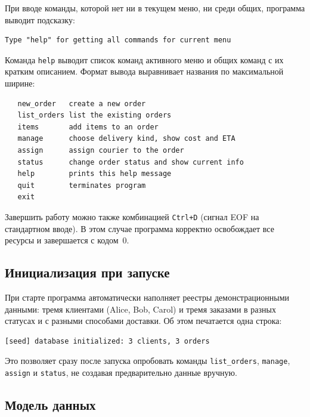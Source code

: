 \documentclass[12pt]{extarticle}
\renewcommand{\baselinestretch}{1.5}
\newcommand{\cmd}[1]{\texttt{#1}}
\begin{document}
При вводе команды, которой нет ни в текущем меню, ни среди общих,
программа выводит подсказку:

\renewcommand{\baselinestretch}{1}
\begin{lstlisting}
Type "help" for getting all commands for current menu
\end{lstlisting}
\renewcommand{\baselinestretch}{1.5}

Команда \cmd{help} выводит список команд активного меню и общих
команд с их кратким описанием. Формат вывода выравнивает названия
по максимальной ширине:

\renewcommand{\baselinestretch}{1}
\begin{lstlisting}
   new_order   create a new order
   list_orders list the existing orders
   items       add items to an order
   manage      choose delivery kind, show cost and ETA
   assign      assign courier to the order
   status      change order status and show current info
   help        prints this help message
   quit        terminates program
   exit
\end{lstlisting}
\renewcommand{\baselinestretch}{1.5}

Завершить работу можно также комбинацией \texttt{Ctrl+D} (сигнал
EOF на стандартном вводе). В этом случае программа корректно
освобождает все ресурсы и завершается с кодом~0.

\subsection{Инициализация при запуске}

При старте программа автоматически наполняет реестры демонстрационными
данными: тремя клиентами (Alice, Bob, Carol) и тремя заказами в
разных статусах и с разными способами доставки. Об этом печатается
одна строка:

\renewcommand{\baselinestretch}{1}
\begin{lstlisting}
[seed] database initialized: 3 clients, 3 orders
\end{lstlisting}
\renewcommand{\baselinestretch}{1.5}

Это позволяет сразу после запуска опробовать команды
\cmd{list\_orders}, \cmd{manage}, \cmd{assign} и \cmd{status},
не создавая предварительно данные вручную.

\subsection{Модель данных}
\end{document}
